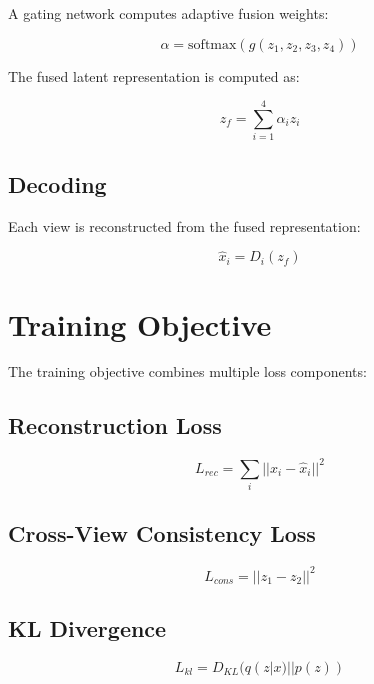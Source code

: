 \documentclass[conference]{IEEEtran}
\begin{document}
A gating network computes adaptive fusion weights:

\begin{equation}
\alpha = \text{softmax}(g(z_1, z_2, z_3, z_4))
\end{equation}

The fused latent representation is computed as:

\begin{equation}
z_f = \sum_{i=1}^{4} \alpha_i z_i
\end{equation}

\subsection{Decoding}

Each view is reconstructed from the fused representation:

\begin{equation}
\hat{x}_i = D_i(z_f)
\end{equation}

\section{Training Objective}

The training objective combines multiple loss components:

\subsection{Reconstruction Loss}

\begin{equation}
L_{rec} = \sum_{i} ||x_i - \hat{x}_i||^2
\end{equation}

\subsection{Cross-View Consistency Loss}

\begin{equation}
L_{cons} = ||z_1 - z_2||^2
\end{equation}

\subsection{KL Divergence}

\begin{equation}
L_{kl} = D_{KL}(q(z|x) || p(z))
\end{equation}
\end{document}
